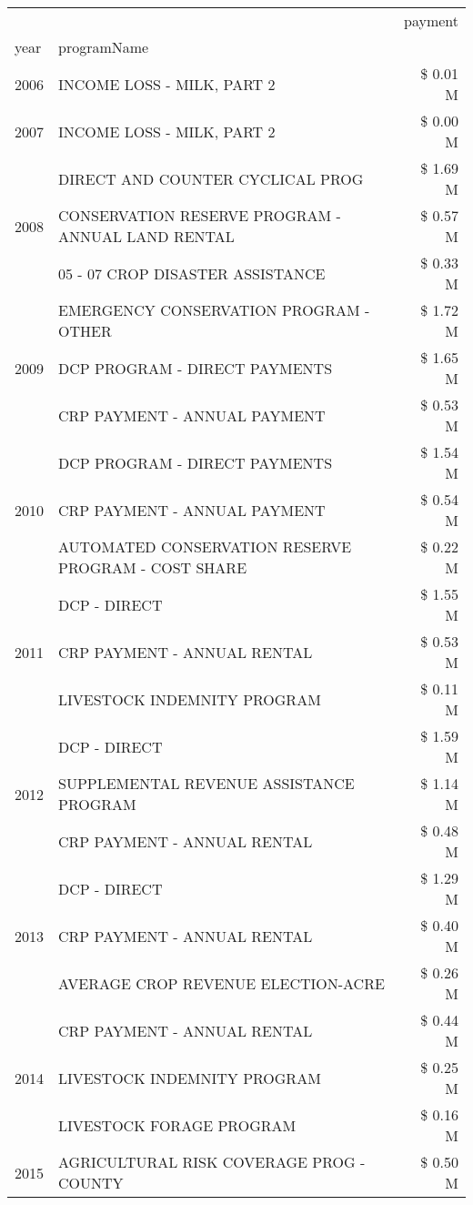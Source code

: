 \begin{tabular}{llr}
\toprule
 &  & payment \\
year & programName &  \\
\midrule
2006 & INCOME LOSS - MILK, PART 2 & \$ 0.01 M \\
\cline{1-3}
2007 & INCOME LOSS - MILK, PART 2 & \$ 0.00 M \\
\cline{1-3}
\multirow[t]{3}{*}{2008} & DIRECT AND COUNTER CYCLICAL PROG & \$ 1.69 M \\
 & CONSERVATION RESERVE PROGRAM - ANNUAL LAND RENTAL & \$ 0.57 M \\
 & 05 - 07 CROP DISASTER ASSISTANCE & \$ 0.33 M \\
\cline{1-3}
\multirow[t]{3}{*}{2009} & EMERGENCY CONSERVATION PROGRAM - OTHER & \$ 1.72 M \\
 & DCP PROGRAM - DIRECT PAYMENTS & \$ 1.65 M \\
 & CRP PAYMENT - ANNUAL PAYMENT & \$ 0.53 M \\
\cline{1-3}
\multirow[t]{3}{*}{2010} & DCP PROGRAM - DIRECT PAYMENTS & \$ 1.54 M \\
 & CRP PAYMENT - ANNUAL PAYMENT & \$ 0.54 M \\
 & AUTOMATED CONSERVATION RESERVE PROGRAM - COST SHARE & \$ 0.22 M \\
\cline{1-3}
\multirow[t]{3}{*}{2011} & DCP - DIRECT & \$ 1.55 M \\
 & CRP PAYMENT - ANNUAL RENTAL & \$ 0.53 M \\
 & LIVESTOCK INDEMNITY PROGRAM & \$ 0.11 M \\
\cline{1-3}
\multirow[t]{3}{*}{2012} & DCP - DIRECT & \$ 1.59 M \\
 & SUPPLEMENTAL REVENUE ASSISTANCE PROGRAM & \$ 1.14 M \\
 & CRP PAYMENT - ANNUAL RENTAL & \$ 0.48 M \\
\cline{1-3}
\multirow[t]{3}{*}{2013} & DCP - DIRECT & \$ 1.29 M \\
 & CRP PAYMENT - ANNUAL RENTAL & \$ 0.40 M \\
 & AVERAGE CROP REVENUE ELECTION-ACRE & \$ 0.26 M \\
\cline{1-3}
\multirow[t]{3}{*}{2014} & CRP PAYMENT - ANNUAL RENTAL & \$ 0.44 M \\
 & LIVESTOCK INDEMNITY PROGRAM & \$ 0.25 M \\
 & LIVESTOCK FORAGE PROGRAM & \$ 0.16 M \\
\cline{1-3}
\multirow[t]{3}{*}{2015} & AGRICULTURAL RISK COVERAGE PROG - COUNTY & \$ 0.50 M \\

\end{tabular}

